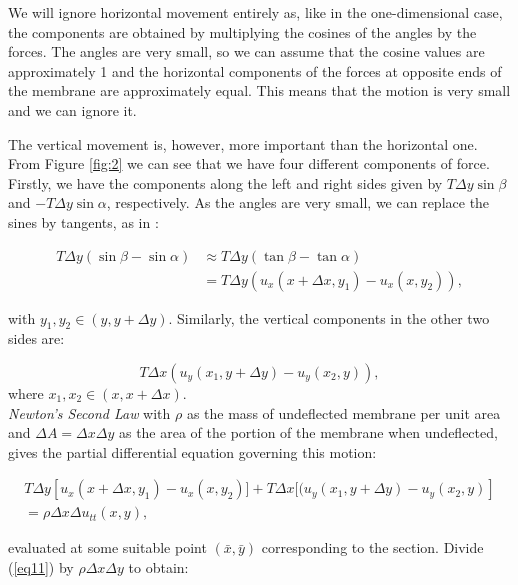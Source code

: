 \documentclass[a4paper, 12pt]{article}
\numberwithin{equation}{section}
\begin{document}
We will ignore horizontal movement entirely as, like in the one-dimensional
case, the components are obtained by multiplying the cosines of the angles by
the forces. The angles are very small, so we can assume that the cosine values
are approximately 1 and the horizontal components of the forces at opposite ends
of the membrane are approximately equal. This means that the motion is very
small and we can ignore it.

The vertical movement is, however, more important than the horizontal one. From
Figure \ref{fig:2} we can see that we have four different components of force.
Firstly, we have the components along the left and right sides given by $T\Delta
y \sin\beta$ and $-T\Delta y\sin\alpha$, respectively. As the angles are very
small, we can replace the sines by tangents, as in \cite{Kr}:

\begin{equation} \label{eq9}
\begin{split} 
    T\Delta y(\sin\beta - \sin\alpha) & \approx T\Delta y(\tan\beta-\tan\alpha)\\
    &= T\Delta y(u_x(x+\Delta x, y_1)-u_x(x, y_2)), 
\end{split}
\end{equation}

with $y_1, y_2 \in(y, y+\Delta y)$. Similarly, the vertical components in the
other two sides are:

\begin {equation} \label{eq10}
    T\Delta x(u_y(x_1, y+\Delta y)-u_y(x_2,y)),
\end{equation}
where $x_1, x_2 \in(x, x+\Delta x)$. \\

\emph{Newton's Second Law} with $\rho$ as the mass of undeflected membrane per
unit area and $\Delta A=\Delta x\Delta y$ as the area of the portion of the
membrane when undeflected, gives the partial differential equation governing
this motion:

\begin{equation} \label{eq11}
    \begin{split}
    T\Delta y\left[u_x(x+\Delta x, y_1)-u_x(x, y_2)]+T\Delta x[(u_y(x_1, y+\Delta y)-u_y(x_2,y)\right]\\
    =\rho\Delta x\Delta u_{tt}(x,y),
\end{split}
\end{equation}

evaluated at some suitable point $(\bar{x},\bar{y})$ corresponding to the
section. Divide (\ref{eq11}) by $\rho\Delta x\Delta y$ to obtain:
\end{document}
